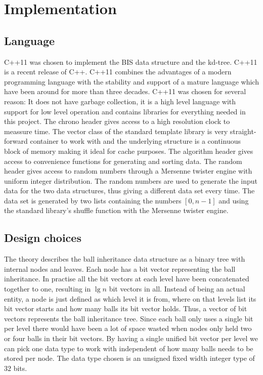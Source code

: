 \chapter{Implementation}
\label{ch:implementation}

\section{Language}

C++11 was chosen to implement the BIS data structure and the kd-tree. C++11 is a recent release of C++. C++11 combines the advantages of a modern programming language with the stability and support of a mature language which have been around for more than three decades. C++11 was chosen for several reason: It does not have garbage collection, it is a high level language with support for low level operation and contains libraries for everything needed in this project. The chrono header gives access to a high resolution clock to meassure time. The vector class of the standard template library is very straight-forward container to work with and the underlying structure is a continuous block of memory making it ideal for cache purposes. The algorithm header gives access to convenience functions for generating and sorting data. The random header gives access to random numbers through a Mersenne twister engine with uniform integer distribution. The random numbers are used to generate the input data for the two data structures, thus giving a different data set every time. The data set is generated by two lists containing the numbers $[0,n-1]$ and using the standard library's shuffle function with the Mersenne twister engine. 

\section{Design choices}

The theory describes the ball inheritance data structure as a binary tree with internal nodes and leaves. Each node has a bit vector representing the ball inheritance. In practise all the bit vectors at each level have been concatenated together to one, resulting in $\lg n$ bit vectors in all. Instead of being an actual entity, a node is just defined as which level it is from, where on that levels list its bit vector starts and how many balls its bit vector holds. Thus, a vector of bit vectors represents the ball inheritance tree. Since each ball only uses a single bit per level there would have been a lot of space wasted when nodes only held two or four balls in their bit vectors. By having a single unified bit vector per level we can pick one data type to work with independent of how many balls needs to be stored per node. The data type chosen is an unsigned fixed width integer type of $32$ bits.

